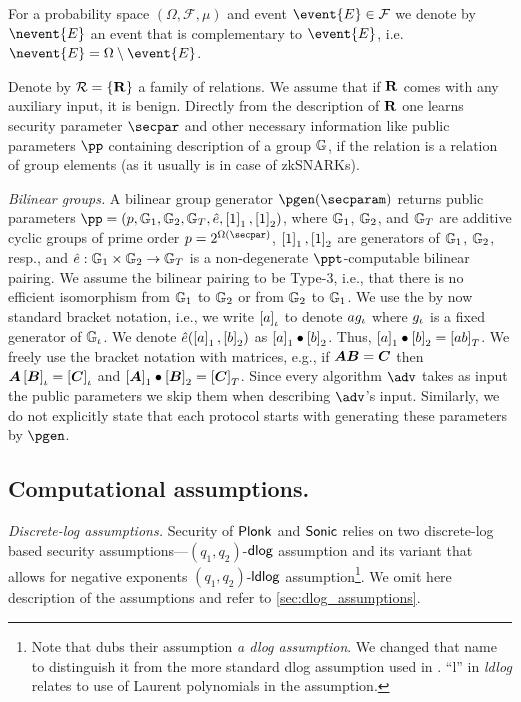 \documentclass[runningheads,11pt]{llncs}
\let\spvec\vec
\let\vec\accentvec
\let\spvec\vec
\let\vec\spvec
\def\vec#1{\mathchoice{\mbox{\boldmath$\displaystyle#1$}}
  {\mbox{\boldmath$\textstyle#1$}} {\mbox{\boldmath$\scriptstyle#1$}}
  {\mbox{\boldmath$\scriptscriptstyle#1$}}}
\newcommand{\ourpar}[1] {\smallskip\noindent\emph{#1}}
\begin{document}
\newcommand{\samplespace}{\Omega}
\newcommand{\eventspace}{\mathcal{F}}
\newcommand{\probfunction}{\mu}

For a probability space $(\samplespace, \eventspace, \probfunction)$ and event
$\event{E} \in \eventspace$ we denote by $\nevent{E}$ an event that is
complementary to $\event{E}$,
i.e.~$\nevent{E} = \samplespace \setminus \event{E}$.

Denote by $\mathcal{R} = \{\mathbf{R}\}$ a family of relations. We assume that if
$\mathbf{R}$ comes with any auxiliary input, it is benign. Directly from the
description of $\mathbf{R}$ one learns security parameter $\secpar$ and other
necessary information like public parameters $\pp$ containing description of a
group $\mathbb{G}$, if the relation is a relation of group elements (as it usually is
in case of zkSNARKs).

\ourpar{Bilinear groups.}
A bilinear group generator $\pgen (\secparam)$ returns public parameters $ \pp =
(p, \GRP_1, \GRP_2, \GRP_T, \pair, \gone{1}, \gtwo{1})$, where $\mathbb{G}_1$,
$\mathbb{G}_2$, and $\mathbb{G}_T$ are additive cyclic groups of prime order $p = 2^{\Omega
  (\secpar)}$, $\left[1\right]_{1}, \left[1\right]_{2}$ are generators of $\mathbb{G}_1$, $\mathbb{G}_2$, resp.,
and $\hat{e}: \mathbb{G}_1 \times \mathbb{G}_2 \to \mathbb{G}_T$ is a non-degenerate
$\ppt$-computable bilinear pairing. We assume the bilinear pairing to be Type-3,
i.e., that there is no efficient isomorphism from $\mathbb{G}_1$ to $\mathbb{G}_2$ or from
$\mathbb{G}_2$ to $\mathbb{G}_1$. We use the by now standard bracket notation, i.e., we
write $\left[a\right]_{\iota}$ to denote $a g_{\iota}$ where $g_{\iota}$ is a fixed generator
of $\mathbb{G}_{\iota}$. We denote $\hat{e} (\left[a\right]_{1}, \left[b\right]_{2})$ as $\left[a\right]_{1} \bullet
\left[b\right]_{2}$. Thus, $\left[a\right]_{1} \bullet \left[b\right]_{2} = \left[a b\right]_{T}$. We freely use the
bracket notation with matrices, e.g., if $\vec{A} \vec{B} = \vec{C}$ then
$\vec{A} \grpgi{\vec{B}} = \grpgi{\vec{C}}$ and $\gone{\vec{A}}\bullet
\gtwo{\vec{B}} = \gtar{\vec{C}}$. Since every algorithm $\adv$ takes as input
the public parameters we skip them when describing $\adv$'s input. Similarly, we
do not explicitly state that each protocol starts with generating these
parameters by $\pgen$.

\subsection{Computational assumptions.}

\ourpar{Discrete-log assumptions.}  Security of $\textnormal{\textsf{Plonk}}$ and ${\textnormal{\textsf{Sonic}}}$ relies on
two discrete-log based security assumptions---$(q_1, q_2)$-$\mathsf{dlog}$ assumption
and its variant that allows for negative exponents $(q_1, q_2)$-$\mathsf{ldlog}$
assumption\footnote{Note that \cite{CCS:MBKM19} dubs their assumption \emph{a
    dlog assumption}. We changed that name to distinguish it from the more
  standard dlog assumption used in \cite{EPRINT:GabWilCio19}. ``l'' in
  \emph{ldlog} relates to use of Laurent polynomials in the assumption.}. We
omit here description of the assumptions and refer to
\cref{sec:dlog_assumptions}.
\end{document}
